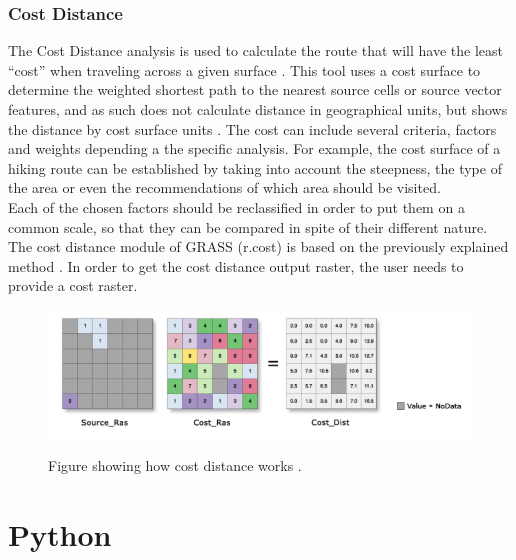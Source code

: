 \subsubsection{Cost Distance}
The Cost Distance analysis is used to calculate the route that will have the least “cost” when traveling across a given surface \citep{grassbook}. This tool uses a cost surface to determine the weighted shortest path to the nearest source cells or source vector features, and as such does not calculate distance in geographical units, but shows the distance by cost surface units \citep{rcost}. The cost can include several criteria, factors and weights depending a the specific analysis. For example, the cost surface of a hiking route can be established by taking into account the steepness, the type of the area or even the recommendations of which area should be visited.\\
Each of the chosen factors should be reclassified in order to put them on a common scale, so that they can be compared in spite of their different nature. 
The cost distance module of GRASS (r.cost) is based on the previously explained method \citep{rcost}. In order to get the cost distance output raster, the user needs to provide a cost raster.

\begin{figure}[t]
\centering
	{\includegraphics[width=\linewidth]{gfx/COST.png}}
\caption{Figure showing how cost distance works \citep{costdistance}.}
\end{figure}


\section{Python}\label{sec:issues}

